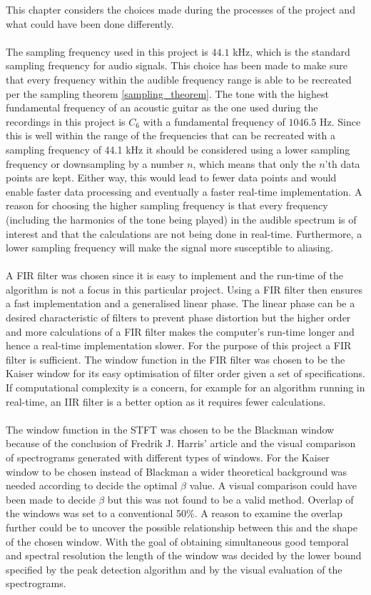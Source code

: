 This chapter considers the choices made during the processes of the project and what could have been done differently.
\\ \\
The sampling frequency used in this project is $44.1$ kHz, which is the standard sampling frequency for audio signals.
This choice has been made to make sure that every frequency within the audible frequency range is able to be recreated per the sampling theorem \ref{sampling_theorem}.
The tone with the highest fundamental frequency of an acoustic guitar as the one used during the recordings in this project is $C_6$ with a fundamental frequency of $1046.5$ Hz.
Since this is well within the range of the frequencies that can be recreated with a sampling frequency of 44.1 kHz it should be considered using a lower sampling frequency or downsampling by a number $n$, which means that only the $n$'th data points are kept. Either way, this would lead to fewer data points and would enable faster data processing and eventually a faster real-time implementation.
A reason for choosing the higher sampling frequency is that every frequency (including the harmonics of the tone being played) in the audible spectrum is of interest and that the calculations are not being done in real-time.
Furthermore, a lower sampling frequency will make the signal more susceptible to aliasing.
\\ \\
A FIR filter was chosen since it is easy to implement and the run-time of the algorithm is not a focus in this particular project. Using a FIR filter then ensures a fast implementation and a generalised linear phase. The linear phase can be a desired characteristic of filters to prevent phase distortion but the higher order and more calculations of a FIR filter makes the computer's run-time longer and hence a real-time implementation slower. For the purpose of this project a FIR filter is sufficient. The window function in the FIR filter was chosen to be the Kaiser window for its easy optimisation of filter order given a set of specifications. If computational complexity is a concern, for example for an algorithm running in real-time, an IIR filter is a better option as it requires fewer calculations.
\\ \\
The window function in the STFT was chosen to be the Blackman window because of the conclusion of Fredrik J. Harris' article and the visual comparison of spectrograms generated with different types of windows. For the Kaiser window to be chosen instead of Blackman a wider theoretical background was needed according to decide the optimal $\beta$ value. A visual comparison could have been made to decide $\beta$ but this was not found to be a valid method. Overlap of the windows was set to a conventional 50\%. A reason to examine the overlap further could be to uncover the possible relationship between this and the shape of the chosen window. With the goal of obtaining simultaneous good temporal and spectral resolution the length of the window was decided by the lower bound specified by the peak detection algorithm and by the visual evaluation of the spectrograms.
